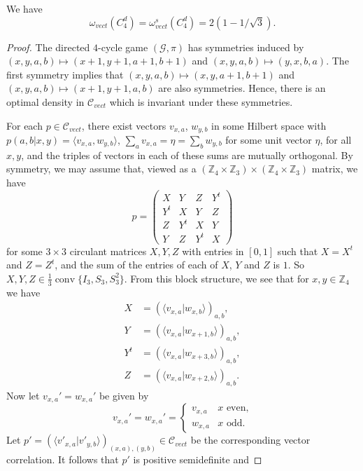 \documentclass[10pt,a4paper]{amsart}
\DeclareMathOperator{\conv}{conv}
\newcommand{\bb}[1]{\mathbb{#1}}
\newcommand{\cl}[1]{\mathcal{#1}}
\begin{document}
  \begin{prop}
    We have \[\omega_{vect}(C_4^d)=\omega_{vect}^s(C_4^d)=2(1-1/\sqrt{3}).\]
  \end{prop}

  \begin{proof}
  The directed $4$-cycle game $(\cl G,\pi)$ has symmetries induced by $(x,y,a,b)\mapsto (x+1,y+1,a+1,b+1)$ and $(x,y,a,b)\mapsto (y,x,b,a)$. The first symmetry implies that $(x,y,a,b)\mapsto(x,y,a+1,b+1)$ and $(x,y,a,b)\mapsto (x+1,y+1,a,b)$ are also symmetries. Hence, there is an optimal density in $\cl C_{vect}$ which is invariant under these symmetries.

  For each $p\in\mathcal{C}_{vect}$, there exist vectors $v_{x,a}$,
  $w_{y,b}$ in some Hilbert space with
  $p(a,b|x,y)=\langle v_{x,a},w_{y,b}\rangle$,
  $\sum_a v_{x,a}=\eta=\sum_b w_{y,b}$ for some unit vector $\eta$,
  for all $x,y$, and the triples of vectors in each of these sums are
  mutually orthogonal. By symmetry, we may assume that, viewed as a $(\bb Z_4\times \bb Z_3)\times (\bb Z_4\times \bb Z_3)$ matrix, we have
  \[ p=\begin{pmatrix}
      X&Y&Z&Y^t\\
      Y^t&X&Y&Z\\
      Z&Y^t&X&Y\\
      Y&Z&Y^t&X
    \end{pmatrix}
  \]
  for some $3\times 3$ circulant matrices $X,Y,Z$ with entries in $[0,1]$ such that $X=X^t$ and $Z=Z^t$, and the sum of the entries of each of $X$, $Y$ and $Z$ is $1$. So $X,Y,Z\in \tfrac13\conv\{I_3,S_3,S_3^2\}$. From this block structure, we see that for $x,y\in \bb Z_4$ we have
  \begin{align*}
    X&=(\langle v_{x,a}|w_{x,b}\rangle)_{a,b},
    \\
    Y&=(\langle v_{x,a}|w_{x+1,b}\rangle)_{a,b},
    \\
    Y^t&=(\langle v_{x,a}|w_{x+3,b}\rangle)_{a,b},
    \\
    Z&=(\langle v_{x,a}|w_{x+2,b}\rangle)_{a,b}.
  \end{align*}
  Now let $v_{x,a}'=w_{x,a}'$ be given by
  \[ v_{x,a}'=w_{x,a}'=
    \begin{cases}
      v_{x,a}&\text{$x$ even,}\\
      w_{x,a}&\text{$x$ odd.}
    \end{cases}
  \]
  Let
  $p'=(\langle v'_{x,a}|v'_{y,b}\rangle)_{(x,a),(y,b)}\in \cl
  C_{vect}$ be the corresponding vector correlation. It follows that
  $p'$ is positive semidefinite and

\end{proof}
\end{document}
